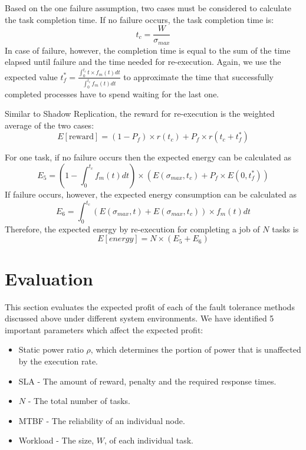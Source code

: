 Based on the one failure assumption, two cases must be considered to
calculate the task completion time. If no failure occurs, the task
completion time is:
\begin{equation}
t_c=\frac{W}{\sigma_{max}}
\end{equation}
In case of failure, however, the completion time is equal to the sum
of the time elapsed until failure and the time needed for
re-execution. Again, we use the expected value
$t_f^*=\frac{\int_0^{t_c}t \times f_m(t)dt}{\int_0^{t_c}f_m(t)dt}$ to
approximate the time that successfully completed processes have to
spend waiting for the last one.

Similar to Shadow Replication, the reward for re-execution is the
weighted average of the two cases:
\begin{equation}
E[\text{reward}]=(1-P_f) \times r(t_c) + P_f \times r(t_c+t_f^{*})
\end{equation}

For one task, if no failure occurs then the expected energy can be
calculated as
\begin{equation}
E_5=(1 - \int_0^{t_c} f_m(t)dt) \times (E(\sigma_{max},t_c)+ P_f \times E(0,t_f^{*}))
\label{eq:energy_first_task}
\end{equation}
If failure occurs, however, the expected energy consumption can be calculated as
\begin{equation}
E_6=\int_0^{t_c}(E(\sigma_{max},t) + E(\sigma_{max},t_c)) \times f_m(t) dt
\label{eq:energy_rexecution_task}
\end{equation}
Therefore, the expected energy by re-execution for
completing a job of $N$ tasks is
\begin{equation}
E[energy]=N \times (E_5 + E_6)
\end{equation}

\section{Evaluation}
\noindent This section evaluates the expected profit of each of the fault tolerance
methods discussed above under different system environments. We have identified 5
important parameters which affect the expected profit:
\begin{itemize}
\item Static power ratio $\rho$, which determines the portion of power that is unaffected by the execution rate.
\item SLA - The amount of reward, penalty and the required response times.
\item $N$ - The total number of tasks.
\item MTBF - The reliability of an individual node.
\item Workload - The size, $W$, of each individual task.
\end{itemize}



